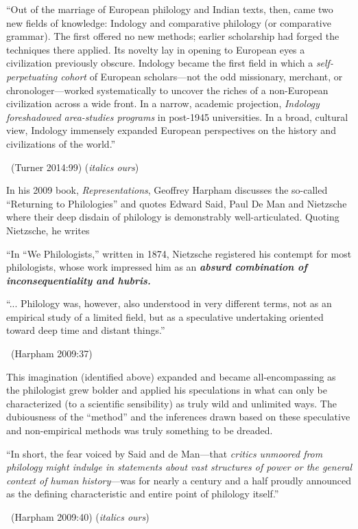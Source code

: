 \begin{myquote}
“Out of the marriage of European philology and Indian texts, then, came two new fields of knowledge: Indology and comparative philology (or comparative grammar). The first offered no new methods; earlier scholarship had forged the techniques there applied. Its novelty lay in opening to European eyes a civilization previously obscure. Indology became the first field in which a \textit{self-perpetuating cohort} of European scholars—not the odd missionary, merchant, or chronologer—worked systematically to uncover the riches of a non-European civilization across a wide front. In a narrow, academic projection, \textit{Indology foreshadowed area-studies programs} in post-1945 universities. In a broad, cultural view, Indology immensely expanded European perspectives on the history and civilizations of the world.”

~\hfill (Turner 2014:99) (\textit{italics ours})
\end{myquote}

In his 2009 book, \textit{Representations}, Geoffrey Harpham discusses the so-called “Returning to Philologies” and quotes Edward Said, Paul De Man and Nietzsche where their deep disdain of philology is demonstrably well-articulated. Quoting Nietzsche, he writes

“In “We Philologists,” written in 1874, Nietzsche registered his contempt for most philologists, whose work impressed him as an \textbf{\textit{absurd combination of inconsequentiality and hubris.}}

\begin{myquote}
“... Philology was, however, also understood in very different terms, not as an empirical study of a limited field, but as a speculative undertaking oriented toward deep time and distant things.”

~\hfill (Harpham 2009:37)
\end{myquote}

This imagination (identified above) expanded and became all-encompassing as the philologist grew bolder and applied his speculations in what can only be characterized (to a scientific sensibility) as truly wild and unlimited ways. The dubiousness of the “method” and the inferences drawn based on these speculative and non-empirical methods was truly something to be dreaded.

\newpage

\begin{myquote}
“In short, the fear voiced by Said and de Man—that \textit{critics unmoored from philology might indulge in statements about vast structures of power or the general context of human history}—was for nearly a century and a half proudly announced as the defining characteristic and entire point of philology itself.”

~\hfill (Harpham 2009:40) (\textit{italics ours})
\end{myquote}

